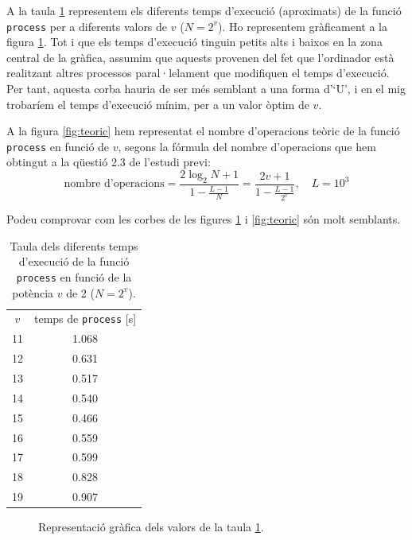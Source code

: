 \documentclass[11pt,a4]{article}
\numberwithin{equation}{section}
\theoremstyle{thmstyle}
\theoremstyle{thmstyle}
\theoremstyle{thmstyle}
\theoremstyle{thmstyle}
\theoremstyle{thmstyle}
\theoremstyle{thmstyle}
\theoremstyle{thmstyle}
\begin{document}
A la taula \ref{tb:temps} representem els diferents temps d'execució (aproximats) de la funció {\tt process} per a diferents valors de $v$ ($N = 2^v$). Ho representem gràficament a la figura \ref{fig:temps}. Tot i que els temps d'execució tinguin petits alts i baixos en la zona central de la gràfica, assumim que aquests provenen del fet que l'ordinador està realitzant altres processos paral·lelament que modifiquen el temps d'execució. Per tant, aquesta corba hauria de ser més semblant a una forma d'`U', i en el mig trobaríem el temps d'execució mínim, per a un valor òptim de $v$.

A la figura \ref{fig:teoric} hem representat el nombre d'operacions teòric de la funció {\tt process} en funció de $v$, segons la fórmula del nombre d'operacions que hem obtingut a la qüestió 2.3 de l'estudi previ:
$$
\text{nombre d'operacions} = \frac{2\log_2 N + 1}{1-\frac{L-1}{N}} =
\frac{2v + 1}{1-\frac{L-1}{2^v}}, \quad L = 10^3
$$

Podeu comprovar com les corbes de les figures \ref{fig:temps} i \ref{fig:teoric} són molt semblants.

\begin{table}
\centering
\begin{tabular}{|c|c|}
\hline
$v$       & temps de {\tt process} [s]  \\
11        & 1.068             \\
12        & 0.631             \\
13        & 0.517             \\
14        & 0.540             \\
15        & 0.466             \\
16        & 0.559             \\
17        & 0.599             \\
18        & 0.828             \\
19        & 0.907             \\
\hline
\end{tabular}
\caption{Taula dels diferents temps d'execució de la funció {\tt process} en funció de la potència $v$ de 2 ($N = 2^v$).}
\label{tb:temps}
\end{table}

\begin{figure}[h]
\centering
{}
\caption{Representació gràfica dels valors de la taula \ref{tb:temps}.}
\label{fig:temps}
\end{figure}
\end{document}
